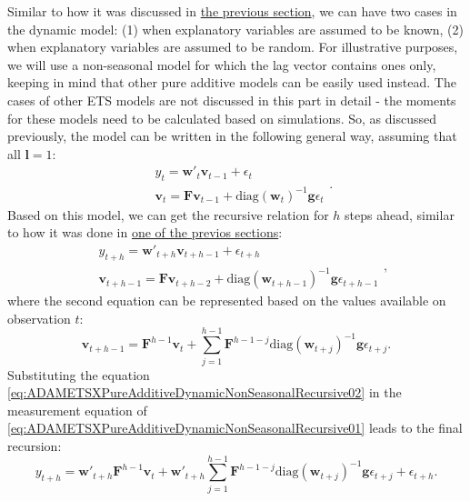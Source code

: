 \documentclass[
]{book}
\theoremstyle{definition}
\theoremstyle{definition}
\theoremstyle{definition}
\theoremstyle{definition}
\theoremstyle{remark}
\begin{document}
Similar to how it was discussed in \protect\hyperlink{ETSXConventionalConditionalMoments}{the previous section}, we can have two cases in the dynamic model: (1) when explanatory variables are assumed to be known, (2) when explanatory variables are assumed to be random. For illustrative purposes, we will use a non-seasonal model for which the lag vector contains ones only, keeping in mind that other pure additive models can be easily used instead. The cases of other ETS models are not discussed in this part in detail - the moments for these models need to be calculated based on simulations. So, as discussed previously, the model can be written in the following general way, assuming that all \(\boldsymbol{l}=1\):
\begin{equation}
  \begin{aligned}
    & {y}_{t} = \mathbf{w}'_t \mathbf{v}_{t-1} + \epsilon_t \\
    & \mathbf{v}_t = \mathbf{F} \mathbf{v}_{t-1} + \mathrm{diag}\left(\mathbf{w}_t\right)^{-1} \mathbf{g} \epsilon_t
  \end{aligned} .
  \label{eq:ADAMETSXPureAdditiveDynamicNonSeasonal}
\end{equation}
Based on this model, we can get the recursive relation for \(h\) steps ahead, similar to how it was done in \protect\hyperlink{adamETSPureAdditiveRecursive}{one of the previos sections}:
\begin{equation}
  \begin{aligned}
    & {y}_{t+h} = \mathbf{w}'_{t+h} \mathbf{v}_{t+h-1} + \epsilon_{t+h} \\
    & \mathbf{v}_{t+h-1} = \mathbf{F} \mathbf{v}_{t+h-2} + \mathrm{diag}\left(\mathbf{w}_{t+h-1}\right)^{-1} \mathbf{g} \epsilon_{t+h-1}
  \end{aligned} ,
  \label{eq:ADAMETSXPureAdditiveDynamicNonSeasonalRecursive01}
\end{equation}
where the second equation can be represented based on the values available on observation \(t\):
\begin{equation}
  \mathbf{v}_{t+h-1} = \mathbf{F}^{h-1} \mathbf{v}_{t} + \sum_{j=1}^{h-1} \mathbf{F}^{h-1-j} \mathrm{diag}\left(\mathbf{w}_{t+j}\right)^{-1} \mathbf{g} \epsilon_{t+j} .
  \label{eq:ADAMETSXPureAdditiveDynamicNonSeasonalRecursive02}
\end{equation}
Substituting the equation \eqref{eq:ADAMETSXPureAdditiveDynamicNonSeasonalRecursive02} in the measurement equation of \eqref{eq:ADAMETSXPureAdditiveDynamicNonSeasonalRecursive01} leads to the final recursion:
\begin{equation}
    {y}_{t+h} = \mathbf{w}'_{t+h} \mathbf{F}^{h-1} \mathbf{v}_{t} + \mathbf{w}'_{t+h} \sum_{j=1}^{h-1} \mathbf{F}^{h-1-j} \mathrm{diag}\left(\mathbf{w}_{t+j}\right)^{-1} \mathbf{g} \epsilon_{t+j} + \epsilon_{t+h} .
  \label{eq:ADAMETSXPureAdditiveDynamicNonSeasonalRecursiveFinal}
\end{equation}
\end{document}
